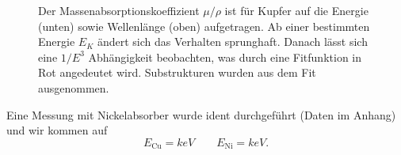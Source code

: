 \begin{figure}[H]
	\centering
	\caption{Der Massenabsorptionskoeffizient \( \mu/\rho \) ist für Kupfer auf die Energie (unten) sowie Wellenlänge (oben) aufgetragen. Ab einer bestimmten Energie \( E_K \) ändert sich das Verhalten sprunghaft. Danach lässt sich eine \( 1/E^3 \) Abhängigkeit beobachten, was durch eine Fitfunktion in Rot angedeutet wird. Substrukturen wurden aus dem Fit ausgenommen.}
	\label{fig:Ex4_3}
\end{figure}

Eine Messung mit Nickelabsorber wurde ident durchgeführt (Daten im Anhang) und wir kommen auf
\begin{equation*}
	E_{\text{Cu}} = \unit{keV} \qquad E_{\text{Ni}} = \unit{keV}.
\end{equation*}





